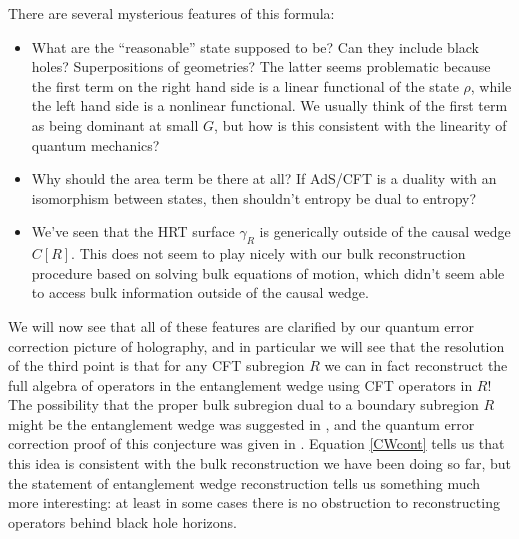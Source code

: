 \documentclass[toc]{PoS}
\newcommand{\bi}{\begin{itemize}}
\newcommand{\ei}{\end{itemize}}
\begin{document}
There are several mysterious features of this formula:
\bi 
\item What are the ``reasonable'' state supposed to be?  Can they include black holes?  Superpositions of geometries? The latter seems problematic because the first term on the right hand side is a linear functional of the state $\rho$, while the left hand side is a nonlinear functional.  We usually think of the first term as being dominant at small $G$, but how is this consistent with the linearity of quantum mechanics? \cite{Papadodimas:2015jra,Almheiri:2016blp}
\item Why should the area term be there at all?  If AdS/CFT is a duality with an isomorphism between states, then shouldn't entropy be dual to entropy? 
\item We've seen that the HRT surface $\gamma_R$ is generically outside of the causal wedge $C[R]$.  This does not seem to play nicely with our bulk reconstruction procedure based on solving bulk equations of motion, which didn't seem able to access bulk information outside of the causal wedge.
\ei
We will now see that all of these features are clarified by our quantum error correction picture of holography, and in particular we will see that the resolution of the third point is that for any CFT subregion $R$ we can in fact reconstruct the full algebra of operators in the entanglement wedge using CFT operators in $R$!  The possibility that the proper bulk subregion dual to a boundary subregion $R$ might be the entanglement wedge was suggested in \cite{Czech:2012bh,Wall:2012uf,Headrick:2014cta}, and the quantum error correction proof of this conjecture was given in \cite{Dong:2016eik}. Equation \eqref{CWcont} tells us that this idea is consistent with the bulk reconstruction we have been doing so far,  but the statement of entanglement wedge reconstruction tells us something much more interesting: at least in some cases there is no obstruction to reconstructing operators behind black hole horizons.
\end{document}
